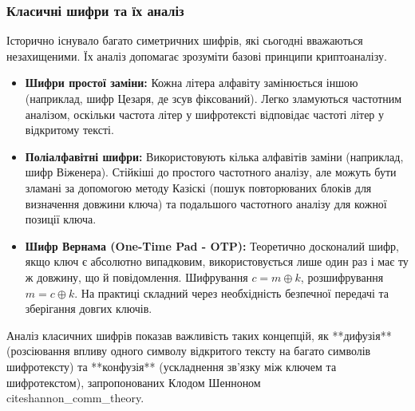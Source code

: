 \documentclass[a4paper,12pt]{article}
\begin{document}
    \subsubsection{Класичні шифри та їх аналіз} %
    Історично існувало багато симетричних шифрів, які сьогодні вважаються незахищеними. Їх аналіз допомагає зрозуміти базові принципи криптоаналізу.
    \begin{itemize}
        \item \textbf{Шифри простої заміни:} Кожна літера алфавіту замінюється іншою (наприклад, шифр Цезаря, де зсув фіксований). Легко зламуються частотним аналізом, оскільки частота літер у шифротексті відповідає частоті літер у відкритому тексті.
        \item \textbf{Поліалфавітні шифри:} Використовують кілька алфавітів заміни (наприклад, шифр Віженера). Стійкіші до простого частотного аналізу, але можуть бути зламані за допомогою методу Казіскі (пошук повторюваних блоків для визначення довжини ключа) та подальшого частотного аналізу для кожної позиції ключа.
        \item \textbf{Шифр Вернама (One-Time Pad - OTP):} Теоретично досконалий шифр, якщо ключ є абсолютно випадковим, використовується лише один раз і має ту ж довжину, що й повідомлення. Шифрування \(c = m \oplus k\), розшифрування \(m = c \oplus k\). На практиці складний через необхідність безпечної передачі та зберігання довгих ключів.
    \end{itemize}
    Аналіз класичних шифрів показав важливість таких концепцій, як **дифузія** (розсіювання впливу одного символу відкритого тексту на багато символів шифротексту) та **конфузія** (ускладнення зв'язку між ключем та шифротекстом), запропонованих Клодом Шенноном \\cite{shannon_comm_theory}.
\end{document}

